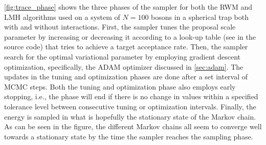 \autoref{fig:trace_phase} shows the three phases of the sampler for both the RWM and LMH algorithms used on a system of $N=100$ bosons in a spherical trap both with and without interactions. First, the sampler tunes the proposal scale parameter by increasing or decreasing it according to a look-up table (see  in the source code) that tries to achieve a target acceptance rate. Then, the sampler search for the optimal variational parameter by employing gradient descent optimization, specifically, the ADAM optimizer discussed in \autoref{sec:adam}. The updates in the tuning and optimization phases are done after a set interval of MCMC steps. Both the tuning and optimization phase also employs early stopping, i.e., the phase will end if there is no change in values within a specified tolerance level between consecutive tuning or optimization intervals. Finally, the energy is sampled in what is hopefully the stationary state of the Markov chain. As can be seen in the figure, the different Markov chains all seem to converge well towards a stationary state by the time the sampler reaches the sampling phase. 

